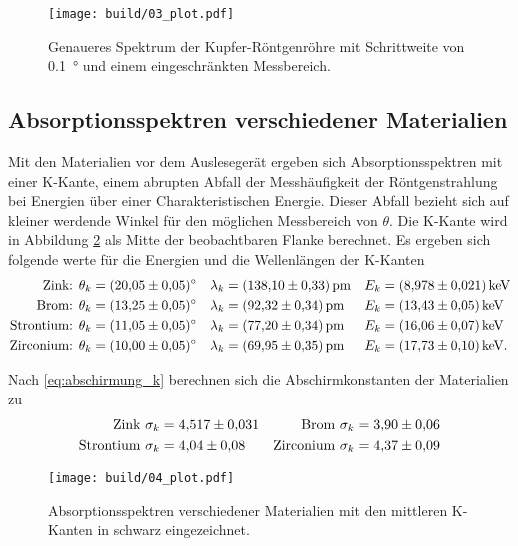 \begin{figure}
    \centering
    \texttt{[image: build/03\_plot.pdf]}
    \caption{Genaueres Spektrum der Kupfer-Röntgenröhre mit Schrittweite von \qty{0.1}{\degree} und einem eingeschränkten Messbereich.}
    \label{fig:03}
\end{figure}




\subsection{Absorptionsspektren verschiedener Materialien}
Mit den Materialien vor dem Auslesegerät ergeben sich Absorptionsspektren mit einer K-Kante, einem abrupten Abfall
der Messhäufigkeit der Röntgenstrahlung bei Energien über einer Charakteristischen Energie.
Dieser Abfall bezieht sich auf kleiner werdende Winkel für den möglichen Messbereich von $\theta$.
Die K-Kante wird in Abbildung \ref{fig:04} als Mitte der beobachtbaren Flanke berechnet.
Es ergeben sich folgende werte für die Energien und die Wellenlängen der K-Kanten
\begin{align}
    \text{Zink:       } \theta_k &= \qty{20.05 \pm 0.05}{\degree} & \lambda_k &= \qty{138.10 \pm 0.33}{\pico\meter} & E_k &= \qty{8.978 \pm 0.021}{ \kilo\eV } \\
    \text{Brom:       } \theta_k &= \qty{13.25 \pm 0.05}{\degree} & \lambda_k &= \qty{92.32 \pm 0.34 }{\pico\meter} & E_k &= \qty{13.43 \pm 0.05 }{ \kilo\eV }\\
    \text{Strontium:  } \theta_k &= \qty{11.05 \pm 0.05}{\degree} & \lambda_k &= \qty{77.20 \pm 0.34 }{\pico\meter} & E_k &= \qty{16.06 \pm 0.07 }{ \kilo\eV }\\
    \text{Zirconium:  } \theta_k &= \qty{10.00 \pm 0.05}{\degree} & \lambda_k &= \qty{69.95 \pm 0.35 }{\pico\meter} & E_k &= \qty{17.73 \pm 0.10}{\kilo\eV}. 
    \label{eq:absorptionskanten}
\end{align}

\noindent
Nach \eqref{eq:abschirmung_k} berechnen sich die Abschirmkonstanten der Materialien zu
\begin{align*}
    \text{Zink      } \sigma_k &= \num{4.517 \pm 0.031} &
    \text{Brom      } \sigma_k &= \num{3.90 \pm 0.06} \\
    \text{Strontium } \sigma_k &= \num{4.04 \pm 0.08} &
    \text{Zirconium } \sigma_k &= \num{4.37 \pm 0.09} 
\end{align*}

\begin{figure}
    \centering
    \texttt{[image: build/04\_plot.pdf]}
    \caption{Absorptionsspektren verschiedener Materialien mit den mittleren K-Kanten in schwarz eingezeichnet.}
    \label{fig:04}
\end{figure}

